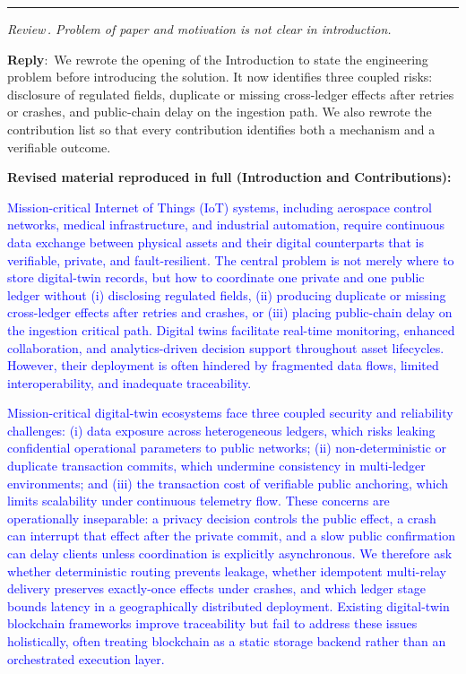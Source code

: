 \documentclass[11pt]{article}
\newcounter{reviewer}
\newcounter{point}[reviewer]
\renewcommand{\thepoint}{Review\,\thereviewer.\arabic{point}}
\newcommand{\point}[1]{\refstepcounter{point}  \bigskip \hrule \medskip \noindent \textit{{\fontseries{b}\selectfont \thepoint } #1}\par}
\newcommand{\reply}{\medskip \noindent \textbf{Reply}:\ }
\begin{document}
\point{Problem of paper and motivation is not clear in introduction.}

\reply{We rewrote the opening of the Introduction to state the engineering
problem before introducing the solution. It now identifies three coupled risks:
disclosure of regulated fields, duplicate or missing cross-ledger effects after
retries or crashes, and public-chain delay on the ingestion path. We also
rewrote the contribution list so that every contribution identifies both a
mechanism and a verifiable outcome.}

\medskip
\noindent\textbf{Revised material reproduced in full (Introduction and Contributions):}

\textcolor{blue}{Mission-critical Internet of Things (IoT) systems, including aerospace control networks, medical infrastructure, and industrial automation, require continuous data exchange between physical assets and their digital counterparts that is verifiable, private, and fault-resilient. The central problem is not merely where to store digital-twin records, but how to coordinate one private and one public ledger without (i) disclosing regulated fields, (ii) producing duplicate or missing cross-ledger effects after retries and crashes, or (iii) placing public-chain delay on the ingestion critical path. Digital twins facilitate real-time monitoring, enhanced collaboration, and analytics-driven decision support throughout asset lifecycles. However, their deployment is often hindered by fragmented data flows, limited interoperability, and inadequate traceability.}

\textcolor{blue}{Mission-critical digital-twin ecosystems face three coupled security and reliability challenges: (i) data exposure across heterogeneous ledgers, which risks leaking confidential operational parameters to public networks; (ii) non-deterministic or duplicate transaction commits, which undermine consistency in multi-ledger environments; and (iii) the transaction cost of verifiable public anchoring, which limits scalability under continuous telemetry flow. These concerns are operationally inseparable: a privacy decision controls the public effect, a crash can interrupt that effect after the private commit, and a slow public confirmation can delay clients unless coordination is explicitly asynchronous. We therefore ask whether deterministic routing prevents leakage, whether idempotent multi-relay delivery preserves exactly-once effects under crashes, and which ledger stage bounds latency in a geographically distributed deployment. Existing digital-twin blockchain frameworks improve traceability but fail to address these issues holistically, often treating blockchain as a static storage backend rather than an orchestrated execution layer.}
\end{document}
